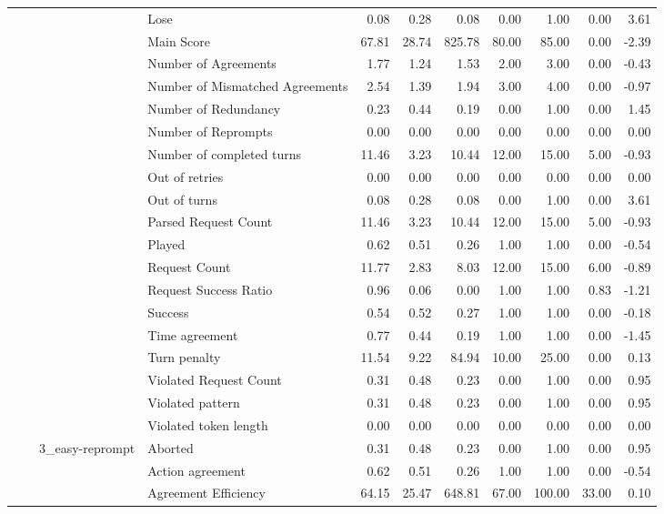 \begin{tabular}{llllrrrrrrr}
 &  &  & Lose & 0.08 & 0.28 & 0.08 & 0.00 & 1.00 & 0.00 & 3.61 \\
 &  &  & Main Score & 67.81 & 28.74 & 825.78 & 80.00 & 85.00 & 0.00 & -2.39 \\
 &  &  & Number of Agreements & 1.77 & 1.24 & 1.53 & 2.00 & 3.00 & 0.00 & -0.43 \\
 &  &  & Number of Mismatched Agreements & 2.54 & 1.39 & 1.94 & 3.00 & 4.00 & 0.00 & -0.97 \\
 &  &  & Number of Redundancy & 0.23 & 0.44 & 0.19 & 0.00 & 1.00 & 0.00 & 1.45 \\
 &  &  & Number of Reprompts & 0.00 & 0.00 & 0.00 & 0.00 & 0.00 & 0.00 & 0.00 \\
 &  &  & Number of completed turns & 11.46 & 3.23 & 10.44 & 12.00 & 15.00 & 5.00 & -0.93 \\
 &  &  & Out of retries & 0.00 & 0.00 & 0.00 & 0.00 & 0.00 & 0.00 & 0.00 \\
 &  &  & Out of turns & 0.08 & 0.28 & 0.08 & 0.00 & 1.00 & 0.00 & 3.61 \\
 &  &  & Parsed Request Count & 11.46 & 3.23 & 10.44 & 12.00 & 15.00 & 5.00 & -0.93 \\
 &  &  & Played & 0.62 & 0.51 & 0.26 & 1.00 & 1.00 & 0.00 & -0.54 \\
 &  &  & Request Count & 11.77 & 2.83 & 8.03 & 12.00 & 15.00 & 6.00 & -0.89 \\
 &  &  & Request Success Ratio & 0.96 & 0.06 & 0.00 & 1.00 & 1.00 & 0.83 & -1.21 \\
 &  &  & Success & 0.54 & 0.52 & 0.27 & 1.00 & 1.00 & 0.00 & -0.18 \\
 &  &  & Time agreement & 0.77 & 0.44 & 0.19 & 1.00 & 1.00 & 0.00 & -1.45 \\
 &  &  & Turn penalty & 11.54 & 9.22 & 84.94 & 10.00 & 25.00 & 0.00 & 0.13 \\
 &  &  & Violated Request Count & 0.31 & 0.48 & 0.23 & 0.00 & 1.00 & 0.00 & 0.95 \\
 &  &  & Violated pattern & 0.31 & 0.48 & 0.23 & 0.00 & 1.00 & 0.00 & 0.95 \\
 &  &  & Violated token length & 0.00 & 0.00 & 0.00 & 0.00 & 0.00 & 0.00 & 0.00 \\
\cline{3-11}
 &  & \multirow[t]{27}{*}{3_easy-reprompt} & Aborted & 0.31 & 0.48 & 0.23 & 0.00 & 1.00 & 0.00 & 0.95 \\
 &  &  & Action agreement & 0.62 & 0.51 & 0.26 & 1.00 & 1.00 & 0.00 & -0.54 \\
 &  &  & Agreement Efficiency & 64.15 & 25.47 & 648.81 & 67.00 & 100.00 & 33.00 & 0.10 \\

\end{tabular}
